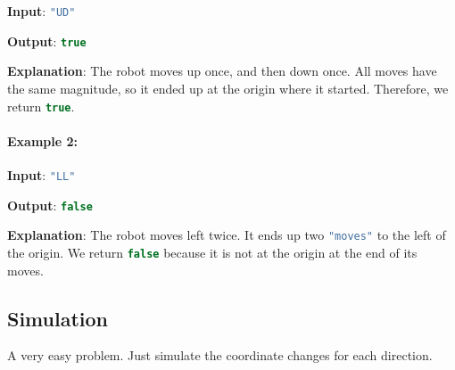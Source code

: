 \begin{flushleft}
\textbf{Input}: \lstinline[language=C++, basicstyle=\small\ttfamily, keywordstyle=\bfseries\color{green!40!black}]|"UD"|

\textbf{Output}: \lstinline[language=C++, basicstyle=\small\ttfamily, keywordstyle=\bfseries\color{green!40!black}]|true|

\textbf{Explanation}: The robot moves up once, and then down once. All moves have the same magnitude, so it ended up at the origin where it started. Therefore, we return \lstinline[language=C++, basicstyle=\small\ttfamily, keywordstyle=\bfseries\color{green!40!black}]|true|.

\end{flushleft}
 

\paragraph{Example 2:}

\begin{flushleft}
\textbf{Input}: \lstinline[language=C++, basicstyle=\small\ttfamily, keywordstyle=\bfseries\color{green!40!black}]|"LL"|

\textbf{Output}: \lstinline[language=C++, basicstyle=\small\ttfamily, keywordstyle=\bfseries\color{green!40!black}]|false|

\textbf{Explanation}: The robot moves left twice. It ends up two \lstinline[language=C++, basicstyle=\small\ttfamily, keywordstyle=\bfseries\color{green!40!black}]|"moves"| to the left of the origin. We return \lstinline[language=C++, basicstyle=\small\ttfamily, keywordstyle=\bfseries\color{green!40!black}]|false| because it is not at the origin at the end of its moves.
\end{flushleft}

\subsection{Simulation}
A very easy problem. Just simulate the coordinate changes for each direction.